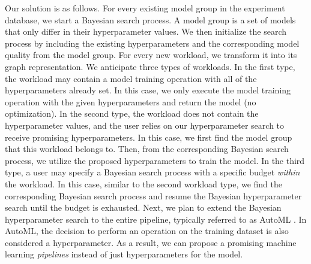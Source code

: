 Our solution is as follows.
For every existing model group in the experiment database, we start a Bayesian search process.
A model group is a set of models that only differ in their hyperparameter values.
We then initialize the search process by including the existing hyperparameters and the corresponding model quality from the model group.
For every new workload, we transform it into its graph representation.
We anticipate three types of workloads.
In the first type, the workload may contain a model training operation with all of the hyperparameters already set.
In this case, we only execute the model training operation with the given hyperparameters and return the model (no optimization).
In the second type, the workload does not contain the hyperparameter values, and the user relies on our hyperparameter search to receive promising hyperparameters.
In this case, we first find the model group that this workload belongs to.
Then, from the corresponding Bayesian search process, we utilize the proposed hyperparameters to train the model.
In the third type, a user may specify a Bayesian search process with a specific budget \textit{within} the workload.
In this case, similar to the second workload type, we find the corresponding Bayesian search process and resume the Bayesian hyperparameter search until the budget is exhausted.
Next, we plan to extend the Bayesian hyperparameter search to the entire pipeline, typically referred to as AutoML \cite{thornton2013auto}.
In AutoML, the decision to perform an operation on the training dataset is also considered a hyperparameter.
As a result, we can propose a promising machine learning \textit{pipelines} instead of just hyperparameters for the model.

